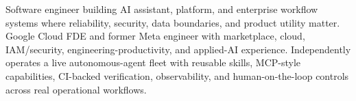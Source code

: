 


Software engineer building AI assistant, platform, and enterprise workflow systems where reliability, security, data boundaries, and product utility matter. Google Cloud FDE and former Meta engineer with marketplace, cloud, IAM/security, engineering-productivity, and applied-AI experience. Independently operates a live autonomous-agent fleet with reusable skills, MCP-style capabilities, CI-backed verification, observability, and human-on-the-loop controls across real operational workflows.







